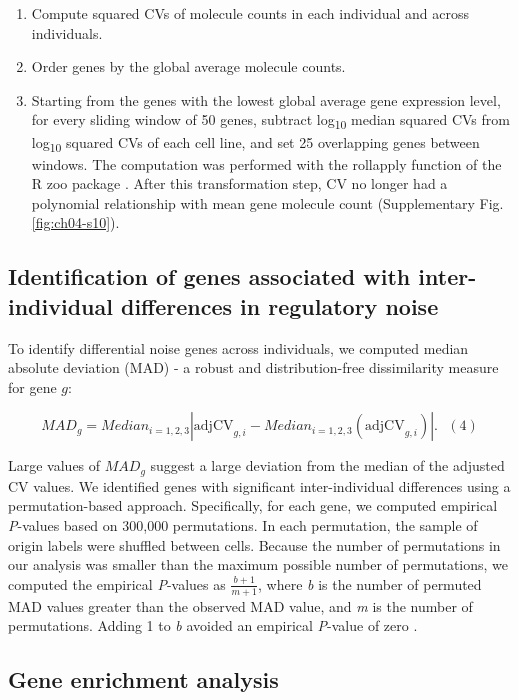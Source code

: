 \begin{enumerate}
\def\labelenumi{\arabic{enumi}.}
\item
  Compute squared CVs of molecule counts in each individual and across
  individuals.
\item
  Order genes by the global average molecule counts.
\item
  Starting from the genes with the lowest global average gene
  expression level, for every sliding window of 50 genes, subtract
  log\textsubscript{10} median squared CVs from log\textsubscript{10}
  squared CVs of each cell line, and set 25 overlapping genes between
  windows. The computation was performed with the rollapply function
  of the R zoo package \citep{Zeileis2005}. After this transformation
  step, CV no longer had a polynomial relationship with mean gene
  molecule count (Supplementary Fig. \ref{fig:ch04-s10}).
\end{enumerate}

\subsection{Identification of genes associated with inter-individual
differences in regulatory
noise}\label{identification-of-genes-associated-with-inter-individual-differences-in-regulatory-noise}

To identify differential noise genes across individuals, we computed
median absolute deviation (MAD) - a robust and distribution-free
dissimilarity measure for gene $g$:

\[ MAD_{g} = Median_{i= 1,2,3} \left| \text{adjCV}_{g,i} -  Median_{i= 1,2,3} ({\text{adjCV}}_{g,i}) \right|. \,\,\,\,(4)\]

Large values of $MAD_{g}$ suggest a large deviation from the median of
the adjusted CV values. We identified genes with significant
inter-individual differences using a permutation-based approach.
Specifically, for each gene, we computed empirical \emph{P}-values
based on 300,000 permutations. In each permutation, the sample of
origin labels were shuffled between cells. Because the number of
permutations in our analysis was smaller than the maximum possible
number of permutations, we computed the empirical \emph{P}-values as
$\frac{b + 1}{m + 1}$, where \emph{b} is the number of permuted MAD
values greater than the observed MAD value, and \emph{m} is the number
of permutations. Adding 1 to \emph{b} avoided an empirical
\emph{P}-value of zero \citep{Phipson2010}.

\subsection{Gene enrichment analysis}\label{gene-enrichment-analysis}


